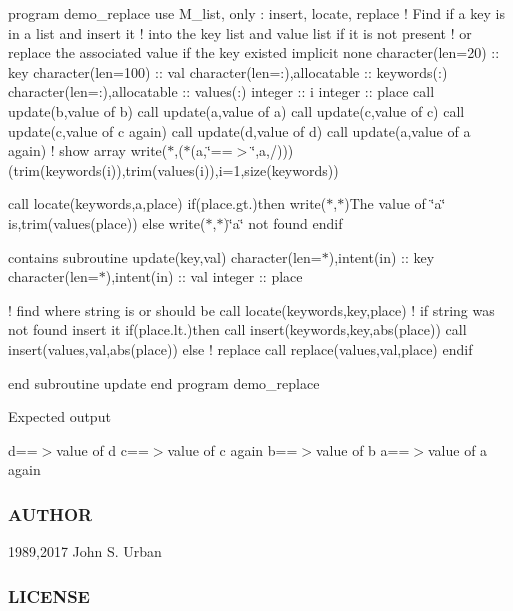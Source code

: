 program demo\+\_\+replace use M\+\_\+list, only \+: insert, locate, replace ! Find if a key is in a list and insert it ! into the key list and value list if it is not present ! or replace the associated value if the key existed implicit none character(len=20) \+:\+: key character(len=100) \+:\+: val character(len=\+:),allocatable \+:\+: keywords(\+:) character(len=\+:),allocatable \+:\+: values(\+:) integer \+:\+: i integer \+:\+: place call update(\textquotesingle{}b\textquotesingle{},\textquotesingle{}value of b\textquotesingle{}) call update(\textquotesingle{}a\textquotesingle{},\textquotesingle{}value of a\textquotesingle{}) call update(\textquotesingle{}c\textquotesingle{},\textquotesingle{}value of c\textquotesingle{}) call update(\textquotesingle{}c\textquotesingle{},\textquotesingle{}value of c again\textquotesingle{}) call update(\textquotesingle{}d\textquotesingle{},\textquotesingle{}value of d\textquotesingle{}) call update(\textquotesingle{}a\textquotesingle{},\textquotesingle{}value of a again\textquotesingle{}) ! show array write($\ast$,\textquotesingle{}($\ast$(a,\char`\"{}==$>$\char`\"{},a,/))\textquotesingle{})(trim(keywords(i)),trim(values(i)),i=1,size(keywords))

call locate(keywords,\textquotesingle{}a\textquotesingle{},place) if(place.\+gt.)then write($\ast$,$\ast$)\textquotesingle{}The value of \char`\"{}a\char`\"{} is\textquotesingle{},trim(values(place)) else write($\ast$,$\ast$)\textquotesingle{}\char`\"{}a\char`\"{} not found\textquotesingle{} endif

contains subroutine update(key,val) character(len=$\ast$),intent(in) \+:\+: key character(len=$\ast$),intent(in) \+:\+: val integer \+:\+: place

! find where string is or should be call locate(keywords,key,place) ! if string was not found insert it if(place.\+lt.)then call insert(keywords,key,abs(place)) call insert(values,val,abs(place)) else ! replace call replace(values,val,place) endif

end subroutine update end program demo\+\_\+replace

Expected output

d==$>$value of d c==$>$value of c again b==$>$value of b a==$>$value of a again

\subsubsection*{A\+U\+T\+H\+OR}

1989,2017 John S. Urban \subsubsection*{L\+I\+C\+E\+N\+SE}

